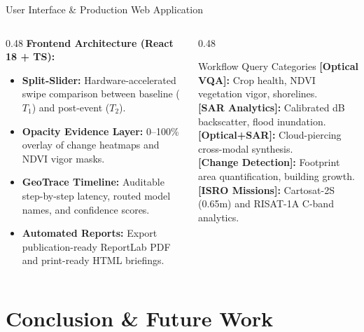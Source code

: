 \documentclass[aspectratio=169, 10pt]{beamer}
\begin{document}
\begin{frame}{User Interface \& Production Web Application}
  \vspace{-0.2em}
  \begin{columns}[T]
    \begin{column}{0.48\textwidth}
      \textbf{\color{IEEEDarkBlue}Frontend Architecture (React 18 + TS):}
      \begin{itemize}\setlength{\itemsep}{2.5pt}\small
        \item \textbf{Split-Slider:} Hardware-accelerated swipe comparison between baseline ($T_1$) and post-event ($T_2$).
        \item \textbf{Opacity Evidence Layer:} 0--100\% overlay of change heatmaps and NDVI vigor masks.
        \item \textbf{GeoTrace Timeline:} Auditable step-by-step latency, routed model names, and confidence scores.
        \item \textbf{Automated Reports:} Export publication-ready ReportLab PDF and print-ready HTML briefings.
      \end{itemize}
    \end{column}

    \begin{column}{0.48\textwidth}
      \begin{block}{\small Workflow Query Categories}
        \scriptsize\setlength{\itemsep}{2pt}
        \textbf{[Optical VQA]:} Crop health, NDVI vegetation vigor, shorelines.\\
        \textbf{[SAR Analytics]:} Calibrated dB backscatter, flood inundation.\\
        \textbf{[Optical+SAR]:} Cloud-piercing cross-modal synthesis.\\
        \textbf{[Change Detection]:} Footprint area quantification, building growth.\\
        \textbf{[ISRO Missions]:} Cartosat-2S (0.65m) and RISAT-1A C-band analytics.
      \end{block}
    \end{column}
  \end{columns}
\end{frame}

\section{Conclusion \& Future Work}
\end{document}
